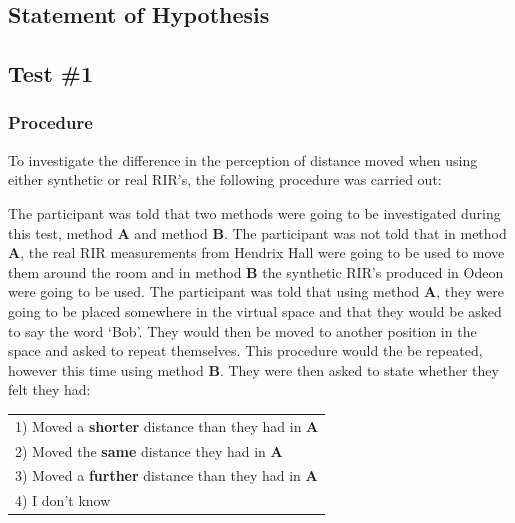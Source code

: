 \documentclass[../../main.tex]{subfiles}
\begin{document}
	\subsection{Statement of Hypothesis}

	\subsection{Test \#1}
	

		\subsubsection{Procedure}

			To investigate the difference in the perception of distance moved when using either synthetic or real \ac{RIR}'s, the following procedure was carried out:


			The participant was told that two methods were going to be investigated during this test, method \textbf{A} and method \textbf{B}. The participant was not told that in method \textbf{A}, the real \ac{RIR} measurements from Hendrix Hall were going to be used to move them around the room and in method \textbf{B} the synthetic \ac{RIR}'s produced in Odeon were going to be used. The participant was told that using method \textbf{A}, they were going to be placed somewhere in the virtual space and that they would be asked to say the word `Bob'. They would then be moved to another position in the space and asked to repeat themselves. This procedure would the be repeated, however this time using method \textbf{B}. They were then asked to state whether they felt they had:

			\begin{center}
			    \begin{tabular}{l}
			       1) Moved a \textbf{shorter} distance than they had in \textbf{A}\\
			       2) Moved the \textbf{same} distance they had in \textbf{A}\\
			       3) Moved a \textbf{further} distance than they had in \textbf{A}\\
			       4) I don't know\\
			    \end{tabular}
			\end{center}
\end{document}
